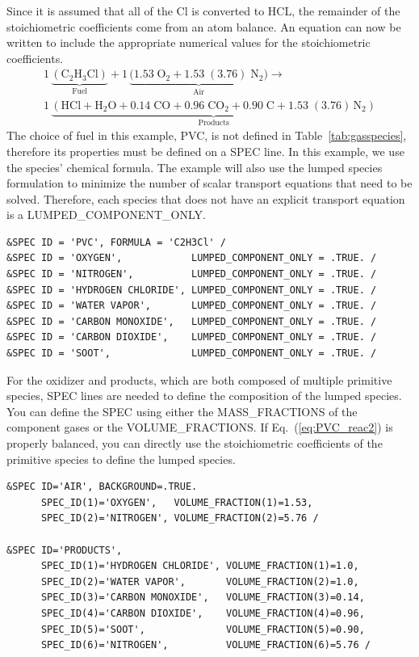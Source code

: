\documentclass[11pt]{book}
\begin{document}
Since it is assumed that all of the Cl is converted to HCL, the remainder of the stoichiometric coefficients come from an atom balance. An equation can now be written to include the appropriate numerical values for the stoichiometric coefficients.
\begin{multline}\label{eq:PVC_reac2}
1\,\underbrace{\mathrm{(C_2H_3Cl)}}_\text{Fuel} + 1\,\underbrace{\mathrm{(1.53 \; O_2 + 1.53 \;(3.76) \; N_2})}_\text{Air} \longrightarrow \\
1\,\underbrace{\mathrm{(HCl +  H_2O + 0.14 \; CO + 0.96 \; CO_2 + 0.90\; C + 1.53\; (3.76) \, N_2)}}_\text{Products}
\end{multline}
The choice of fuel in this example, PVC, is not defined in Table~\ref{tab:gasspecies}, therefore its properties must be defined on a {\ct SPEC} line. In this example, we use the species' chemical formula. The example will also use the lumped species formulation to minimize the number of scalar transport equations that need to be solved. Therefore, each species that does not have an explicit transport equation is a {\ct LUMPED\_COMPONENT\_ONLY}.
\begin{lstlisting}
&SPEC ID = 'PVC', FORMULA = 'C2H3Cl' /
&SPEC ID = 'OXYGEN',            LUMPED_COMPONENT_ONLY = .TRUE. /
&SPEC ID = 'NITROGEN',          LUMPED_COMPONENT_ONLY = .TRUE. /
&SPEC ID = 'HYDROGEN CHLORIDE', LUMPED_COMPONENT_ONLY = .TRUE. /
&SPEC ID = 'WATER VAPOR',       LUMPED_COMPONENT_ONLY = .TRUE. /
&SPEC ID = 'CARBON MONOXIDE',   LUMPED_COMPONENT_ONLY = .TRUE. /
&SPEC ID = 'CARBON DIOXIDE',    LUMPED_COMPONENT_ONLY = .TRUE. /
&SPEC ID = 'SOOT',              LUMPED_COMPONENT_ONLY = .TRUE. /
\end{lstlisting}
For the oxidizer and products, which are both composed of multiple primitive species, {\ct SPEC} lines are needed to define the composition of the lumped species. You can define the {\ct SPEC} using either the {\ct MASS\_FRACTIONS} of the component gases or the {\ct VOLUME\_FRACTIONS}. If Eq.~(\ref{eq:PVC_reac2}) is properly balanced, you can directly use the stoichiometric coefficients of the primitive species to define the lumped species.
\begin{lstlisting}
&SPEC ID='AIR', BACKGROUND=.TRUE.
      SPEC_ID(1)='OXYGEN',   VOLUME_FRACTION(1)=1.53,
      SPEC_ID(2)='NITROGEN', VOLUME_FRACTION(2)=5.76 /

&SPEC ID='PRODUCTS',
      SPEC_ID(1)='HYDROGEN CHLORIDE', VOLUME_FRACTION(1)=1.0,
      SPEC_ID(2)='WATER VAPOR',       VOLUME_FRACTION(2)=1.0,
      SPEC_ID(3)='CARBON MONOXIDE',   VOLUME_FRACTION(3)=0.14,
      SPEC_ID(4)='CARBON DIOXIDE',    VOLUME_FRACTION(4)=0.96,
      SPEC_ID(5)='SOOT',              VOLUME_FRACTION(5)=0.90,
      SPEC_ID(6)='NITROGEN',          VOLUME_FRACTION(6)=5.76 /
\end{lstlisting}
\end{document}
